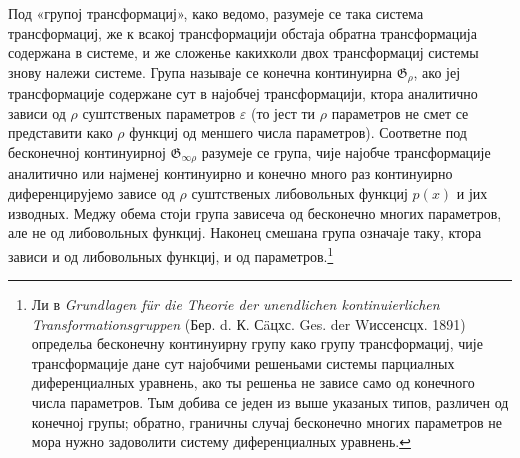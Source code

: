 ﻿\documentclass[11pt]{article}
\providecommand{\G}{\mathfrak G}
\providecommand{\eps}{\varepsilon}
\begin{document}
Под «групој трансформациј», како ведомо, разумеје се така система трансформациј, же к всакој трансформацији обстаја обратна трансформација содержана в системе, и же сложенье какихколи двох трансформациј системы знову належи системе. Група называје се конечна континуирна \(\G_\rho\), ако јеј трансформације содержане сут в најобчеј трансформацији, ктора аналитично зависи од \(\rho\) суштственых параметров \(\eps\) (то јест ти \(\rho\) параметров не смет се представити како \(\rho\) функциј од меншего числа параметров). Соответне под бесконечној континуирној \(\G_{\infty\rho}\) разумеје се група, чије најобче трансформације аналитично или најменеј континуирно и конечно много раз континуирно диференцирујемо зависе од \(\rho\) суштственых либовольных функциј \(p(x)\) и јих изводных. Меджу обема стоји група зависеча од бесконечно многих параметров, але не од либовольных функциј. Наконец смешана група означаје таку, ктора зависи и од либовольных функциј, и од параметров.\footnote{Ли в \emph{Grundlagen für die Theorie der unendlichen kontinuierlichen Transformationsgruppen} (Бер. d. К. Сäцхс. Ges. der Wиссенсцх. 1891) определьа бесконечну континуирну групу како групу трансформациј, чије трансформације дане сут најобчими решеньами системы парциалных диференциалных уравнень, ако ты решеньа не зависе само од конечного числа параметров. Тым добива се једен из выше указаных типов, различен од конечној групы; обратно, граничны случај бесконечно многих параметров не мора нужно задоволити систему диференциалных уравнень.}
\end{document}
